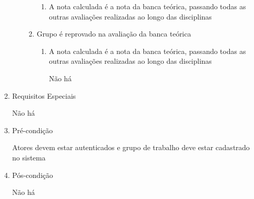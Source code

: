 \begin{enumerate}
\begin{enumerate}
\begin{enumerate}
\begin{enumerate}
    \item A nota calculada é a nota da banca teórica, passando todas as outras avaliações realizadas ao longo das disciplinas


\end{enumerate}
    \item Grupo é reprovado na avaliação da banca teórica

\begin{enumerate}
    \item A nota calculada é a nota da banca teórica, passando todas as outras avaliações realizadas ao longo das disciplinas

Não há



\end{enumerate}
\end{enumerate}
\end{enumerate}
    \item Requisitos Especiais


Não há


    \item Pré-condição


Atores devem estar autenticados e grupo de trabalho deve estar cadastrado no sistema


    \item Pós-condição

    Não há
\end{enumerate}